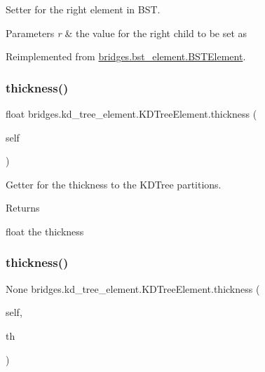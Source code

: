 Setter for the right element in B\+ST. 


\begin{DoxyParams}{Parameters}
{\em r} & the value for the right child to be set as \\
\hline
\end{DoxyParams}


Reimplemented from \mbox{\hyperlink{classbridges_1_1bst__element_1_1_b_s_t_element_a978ae0db366dee59703ed266eebca0e9}{bridges.\+bst\+\_\+element.\+B\+S\+T\+Element}}.

\mbox{\label{classbridges_1_1kd__tree__element_1_1_k_d_tree_element_a936e2b664181ddc85e11a1c1057b3dab}} 
\subsubsection{\texorpdfstring{thickness()}{thickness()}\hspace{0.1cm}{\footnotesize\ttfamily [1/2]}}
{\footnotesize\ttfamily  float bridges.\+kd\+\_\+tree\+\_\+element.\+K\+D\+Tree\+Element.\+thickness (\begin{DoxyParamCaption}\item[{}]{self }\end{DoxyParamCaption})}



Getter for the thickness to the K\+D\+Tree partitions. 

\begin{DoxyReturn}{Returns}


float the thickness 
\end{DoxyReturn}
\mbox{\label{classbridges_1_1kd__tree__element_1_1_k_d_tree_element_ae78db83d6d61169f7afc9c8c4efcb87a}} 
\subsubsection{\texorpdfstring{thickness()}{thickness()}\hspace{0.1cm}{\footnotesize\ttfamily [2/2]}}
{\footnotesize\ttfamily  None bridges.\+kd\+\_\+tree\+\_\+element.\+K\+D\+Tree\+Element.\+thickness (\begin{DoxyParamCaption}\item[{}]{self,  }\item[{}]{th }\end{DoxyParamCaption})}



